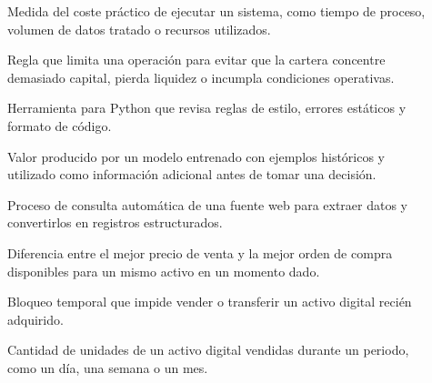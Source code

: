 \begin{description}
  \item[] Medida del coste práctico de ejecutar un sistema, como tiempo de proceso, volumen de datos tratado o recursos utilizados.
  \item[] Regla que limita una operación para evitar que la cartera concentre demasiado capital, pierda liquidez o incumpla condiciones operativas.
  \item[] Herramienta para Python que revisa reglas de estilo, errores estáticos y formato de código.
  \item[] Valor producido por un modelo entrenado con ejemplos históricos y utilizado como información adicional antes de tomar una decisión.
  \item[] Proceso de consulta automática de una fuente web para extraer datos y convertirlos en registros estructurados.
  \item[] Diferencia entre el mejor precio de venta y la mejor orden de compra disponibles para un mismo activo en un momento dado.
  \item[] Bloqueo temporal que impide vender o transferir un activo digital recién adquirido.
  \item[] Cantidad de unidades de un activo digital vendidas durante un periodo, como un día, una semana o un mes.
\end{description}
\indicebottomrule
